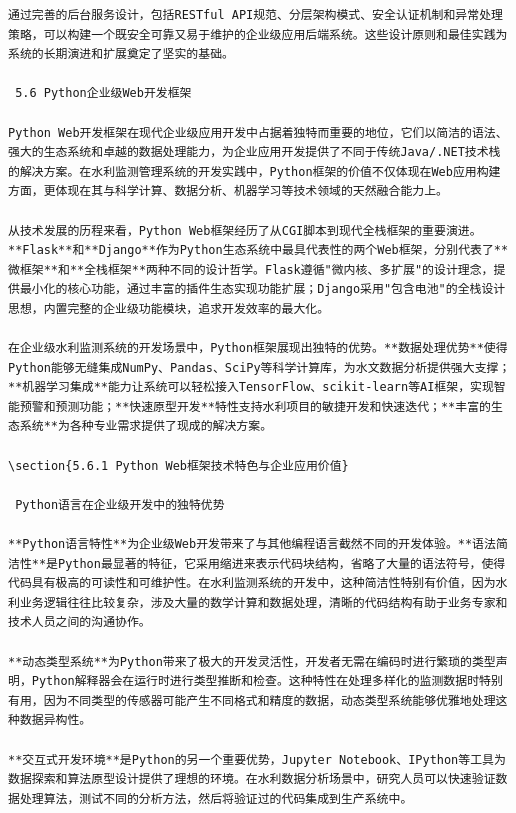 \begin{lstlisting}
通过完善的后台服务设计，包括RESTful API规范、分层架构模式、安全认证机制和异常处理策略，可以构建一个既安全可靠又易于维护的企业级应用后端系统。这些设计原则和最佳实践为系统的长期演进和扩展奠定了坚实的基础。

 5.6 Python企业级Web开发框架

Python Web开发框架在现代企业级应用开发中占据着独特而重要的地位，它们以简洁的语法、强大的生态系统和卓越的数据处理能力，为企业应用开发提供了不同于传统Java/.NET技术栈的解决方案。在水利监测管理系统的开发实践中，Python框架的价值不仅体现在Web应用构建方面，更体现在其与科学计算、数据分析、机器学习等技术领域的天然融合能力上。

从技术发展的历程来看，Python Web框架经历了从CGI脚本到现代全栈框架的重要演进。**Flask**和**Django**作为Python生态系统中最具代表性的两个Web框架，分别代表了**微框架**和**全栈框架**两种不同的设计哲学。Flask遵循"微内核、多扩展"的设计理念，提供最小化的核心功能，通过丰富的插件生态实现功能扩展；Django采用"包含电池"的全栈设计思想，内置完整的企业级功能模块，追求开发效率的最大化。

在企业级水利监测系统的开发场景中，Python框架展现出独特的优势。**数据处理优势**使得Python能够无缝集成NumPy、Pandas、SciPy等科学计算库，为水文数据分析提供强大支撑；**机器学习集成**能力让系统可以轻松接入TensorFlow、scikit-learn等AI框架，实现智能预警和预测功能；**快速原型开发**特性支持水利项目的敏捷开发和快速迭代；**丰富的生态系统**为各种专业需求提供了现成的解决方案。

\section{5.6.1 Python Web框架技术特色与企业应用价值}

 Python语言在企业级开发中的独特优势

**Python语言特性**为企业级Web开发带来了与其他编程语言截然不同的开发体验。**语法简洁性**是Python最显著的特征，它采用缩进来表示代码块结构，省略了大量的语法符号，使得代码具有极高的可读性和可维护性。在水利监测系统的开发中，这种简洁性特别有价值，因为水利业务逻辑往往比较复杂，涉及大量的数学计算和数据处理，清晰的代码结构有助于业务专家和技术人员之间的沟通协作。

**动态类型系统**为Python带来了极大的开发灵活性，开发者无需在编码时进行繁琐的类型声明，Python解释器会在运行时进行类型推断和检查。这种特性在处理多样化的监测数据时特别有用，因为不同类型的传感器可能产生不同格式和精度的数据，动态类型系统能够优雅地处理这种数据异构性。

**交互式开发环境**是Python的另一个重要优势，Jupyter Notebook、IPython等工具为数据探索和算法原型设计提供了理想的环境。在水利数据分析场景中，研究人员可以快速验证数据处理算法，测试不同的分析方法，然后将验证过的代码集成到生产系统中。
\end{lstlisting}

